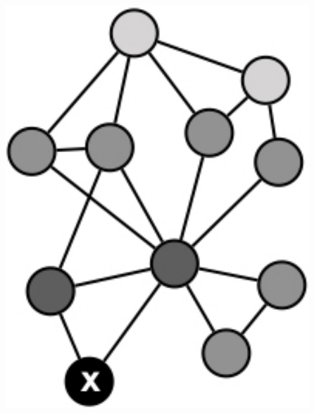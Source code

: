 \documentclass{beamer}
\begin{document}
\begin{frame}
\begin{columns}
\begin{column}{0.35\textwidth}
\begin{center}
		\includegraphics[width=1.0\textwidth]{nbhd_fig}
	\end{center}
\end{column}

\end{columns}


\end{frame}


\end{document}
